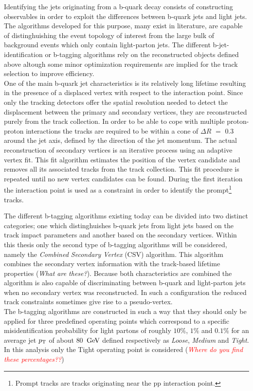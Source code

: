 Identifying the jets originating from a b-quark decay consists of constructing observables in order to exploit the differences between b-quark jets and light jets. The algorithms developed for this purpose, many exist in literature, are capable of distinghuishing the event topology of interest from the large bulk of background events which only contain light-parton jets.
The different b-jet-identification or b-tagging algorithms rely on the reconstructed objects defined above altough some minor optimization requirements are implied for the track selection to improve efficiency.
\\
One of the main b-quark jet characteristics is its relatively long lifetime resulting in the presence of a displaced vertex with respect to the interaction point. Since only the tracking detectors offer the spatial resolution needed to detect the displacement between the primary and secondary vertices, they are reconstructed purely from the track collection. In order to be able to cope with multiple proton-proton interactions the tracks are required to be within a cone of $\Delta R$ $=$ $0.3$ around the jet axis, defined by the direction of the jet momentum. 
The actual reconstruction of secondary vertices is an iterative process using an adaptive vertex fit. This fit algorithm estimates the position of the vertex candidate and removes all its associated tracks from the track collection. This fit procedure is repeated until no new vertex candidates can be found. During the first iteration the interaction point is used as a constraint in order to identify the prompt\footnote{Prompt tracks are tracks originating near the pp interaction point.} tracks.

The different b-tagging algorithms existing today can be divided into two distinct categories; one which distinghuishes b-quark jets from light jets based on the track impact parameters and another based on the secondary vertices. Within this thesis only the second type of b-tagging algorithms will be considered, namely the \textit{Combined Secondary Vertex} (CSV) algorithm. This algorithm combines the secondary vertex information with the track-based lifetime properties (\textit{What are these?}). Because both characteristics are combined the algorithm is also capable of discriminating between b-quark and light-parton jets when no secondary vertex was reconstructed. In such a configuration the reduced track constraints sometimes give rise to a pseudo-vertex.
\\
The b-tagging algorithms are constructed in such a way that they should only be applied for three predefined operating points which correspond to a specific misidentification probability for light partons of roughly $10 \%$, $1 \%$ and $0.1 \%$ for an average jet $p_{\rm T}$ of about $80$ $\, \mathrm{GeV}$ defined respectively as \textit{Loose}, \textit{Medium} and \textit{Tight}. In this analysis only the Tight operating point is considered (\textit{\textcolor{red}{Where do you find these percentages??}})

